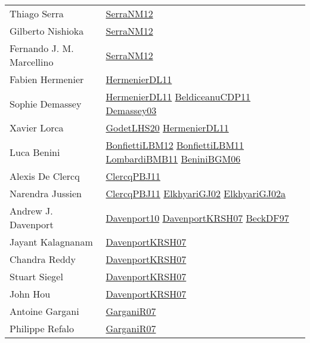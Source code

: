 {\begin{longtable}{p{4cm}p{15cm}}
Thiago Serra & \href{papers/SerraNM12.pdf}{SerraNM12}\cite{SerraNM12} \\
Gilberto Nishioka & \href{papers/SerraNM12.pdf}{SerraNM12}\cite{SerraNM12} \\
Fernando J. M. Marcellino & \href{papers/SerraNM12.pdf}{SerraNM12}\cite{SerraNM12} \\
Fabien Hermenier & \href{papers/HermenierDL11.pdf}{HermenierDL11}\cite{HermenierDL11} \\
Sophie Demassey & \href{papers/HermenierDL11.pdf}{HermenierDL11}\cite{HermenierDL11} \href{articles/BeldiceanuCDP11.pdf}{BeldiceanuCDP11}\cite{BeldiceanuCDP11} \href{}{Demassey03}\cite{Demassey03} \\
Xavier Lorca & \href{papers/GodetLHS20.pdf}{GodetLHS20}\cite{GodetLHS20} \href{papers/HermenierDL11.pdf}{HermenierDL11}\cite{HermenierDL11} \\
Luca Benini & \href{papers/BonfiettiLBM12.pdf}{BonfiettiLBM12}\cite{BonfiettiLBM12} \href{papers/BonfiettiLBM11.pdf}{BonfiettiLBM11}\cite{BonfiettiLBM11} \href{papers/LombardiBMB11.pdf}{LombardiBMB11}\cite{LombardiBMB11} \href{papers/BeniniBGM06.pdf}{BeniniBGM06}\cite{BeniniBGM06} \\
Alexis De Clercq & \href{papers/ClercqPBJ11.pdf}{ClercqPBJ11}\cite{ClercqPBJ11} \\
Narendra Jussien & \href{papers/ClercqPBJ11.pdf}{ClercqPBJ11}\cite{ClercqPBJ11} \href{papers/ElkhyariGJ02.pdf}{ElkhyariGJ02}\cite{ElkhyariGJ02} \href{papers/ElkhyariGJ02a.pdf}{ElkhyariGJ02a}\cite{ElkhyariGJ02a} \\
Andrew J. Davenport & \href{papers/Davenport10.pdf}{Davenport10}\cite{Davenport10} \href{papers/DavenportKRSH07.pdf}{DavenportKRSH07}\cite{DavenportKRSH07} \href{papers/BeckDF97.pdf}{BeckDF97}\cite{BeckDF97} \\
Jayant Kalagnanam & \href{papers/DavenportKRSH07.pdf}{DavenportKRSH07}\cite{DavenportKRSH07} \\
Chandra Reddy & \href{papers/DavenportKRSH07.pdf}{DavenportKRSH07}\cite{DavenportKRSH07} \\
Stuart Siegel & \href{papers/DavenportKRSH07.pdf}{DavenportKRSH07}\cite{DavenportKRSH07} \\
John Hou & \href{papers/DavenportKRSH07.pdf}{DavenportKRSH07}\cite{DavenportKRSH07} \\
Antoine Gargani & \href{papers/GarganiR07.pdf}{GarganiR07}\cite{GarganiR07} \\
Philippe Refalo & \href{papers/GarganiR07.pdf}{GarganiR07}\cite{GarganiR07} \\

\end{longtable}}
